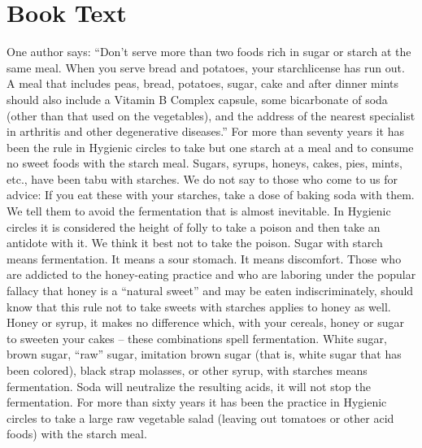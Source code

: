 \documentclass[a4paper, 12pt]{article}
\title{}
\author{}
\begin{document}
\maketitle
\section{Book Text}
One author says: “Don’t serve more than two foods rich in sugar or starch at the same meal. When you serve bread and potatoes, your starchlicense has run out. A meal that includes peas, bread, potatoes, sugar, cake and after dinner mints should also include a Vitamin B Complex capsule, some bicarbonate of soda (other than that used on the vegetables), and the address of the nearest specialist in arthritis and other degenerative diseases.” For more than seventy years it has been the rule in Hygienic circles to take but one starch at a meal and to consume no sweet foods with the starch meal. Sugars, syrups, honeys, cakes, pies, mints, etc., have been tabu with starches. We do not say to those who come to us for advice: If you eat these with your starches, take a dose of baking soda with them. We tell them to avoid the fermentation that is almost inevitable. In Hygienic circles it is considered the height of folly to take a poison and then take an antidote with it. We think it best not to take the poison. Sugar with starch means fermentation. It means a sour stomach. It means discomfort. Those who are addicted to the honey-eating practice and who are laboring under the popular fallacy that honey is a “natural sweet” and may be eaten indiscriminately, should know that this rule not to take sweets with starches applies to honey as well. Honey or syrup, it makes no difference which, with your cereals, honey or sugar to sweeten your cakes – these combinations spell fermentation. White sugar, brown sugar, “raw” sugar, imitation brown sugar (that is, white sugar that has been colored), black strap molasses, or other syrup, with starches means fermentation. Soda will neutralize the resulting acids, it will not stop the fermentation. For more than sixty years it has been the practice in Hygienic circles to take a large raw vegetable salad (leaving out tomatoes or other acid foods) with the starch meal.

\end{document}
